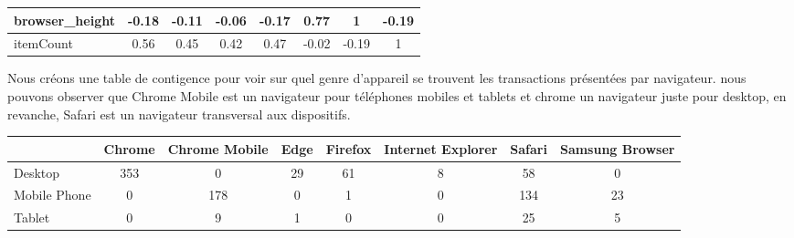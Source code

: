 \begin{table}[ht]
\begin{adjustbox}{width=1\textwidth}
\begin{tabular}{|l|c|c|c|c|c|c|c|}
browser\_height         & -0.18                     & -0.11                          & -0.06                                        & -0.17                           &\cellcolor{green!15} 0.77                                & 1                                    & -0.19                          \\ \hline
itemCount               & 0.56                      & 0.45                           & 0.42                                         & 0.47                            & -0.02                               & -0.19                                & 1                              \\ \hline
\end{tabular}
\end{adjustbox}
\end{table}
 
Nous créons une table de contigence pour voir sur quel genre d'appareil se trouvent les transactions présentées par navigateur. nous pouvons observer que Chrome Mobile est un navigateur pour téléphones mobiles et tablets et chrome un navigateur juste pour desktop, en revanche,  Safari est un navigateur transversal aux dispositifs.
\begin{table}[ht]
\begin{adjustbox}{width=1\textwidth}
\small
\begin{tabular}{|l|c|c|c|c|c|c|c|}
\hline
             & \multicolumn{1}{l|}{Chrome} & \multicolumn{1}{l|}{Chrome Mobile} & \multicolumn{1}{l|}{Edge} & \multicolumn{1}{l|}{Firefox} & \multicolumn{1}{l|}{Internet Explorer} & \multicolumn{1}{l|}{Safari} & \multicolumn{1}{l|}{Samsung Browser} \\ \hline
Desktop      & 353                         & 0                                  & 29                        & 61                           & 8                                      & 58                          & 0                                    \\ \hline
Mobile Phone & 0                           & 178                                & 0                         & 1                            & 0                                      & 134                         & 23                                   \\ \hline
Tablet       & 0                           & 9                                  & 1                         & 0                            & 0                                      & 25                          & 5                                    \\ \hline
\end{tabular}
\end{adjustbox}
\end{table}


